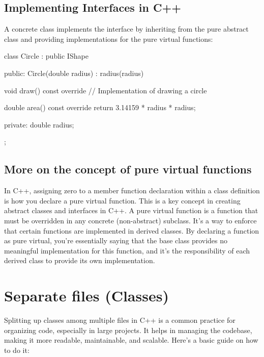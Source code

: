 \documentclass{report}
\begin{document}
    \bigbreak \noindent 
    \subsection{Implementing Interfaces in C++}
    \bigbreak \noindent 
    A concrete class implements the interface by inheriting from the pure abstract class and providing implementations for the pure virtual functions:
    \bigbreak \noindent 
    \begin{cppcode}
class Circle : public IShape {
public:
    Circle(double radius) : radius(radius) {}

    void draw() const override {
        // Implementation of drawing a circle
    }

    double area() const override {
        return 3.14159 * radius * radius;
    }

private:
    double radius;
};
    \end{cppcode}
    \bigbreak \noindent 

    \pagebreak \bigbreak \noindent 
    \subsection{More on the concept of pure virtual functions}
    \bigbreak \noindent 
    \begin{concept}
       In C++, assigning zero to a member function declaration within a class definition is how you declare a pure virtual function. This is a key concept in creating abstract classes and interfaces in C++. 
       \bigbreak \noindent 
       A pure virtual function is a function that must be overridden in any concrete (non-abstract) subclass. It's a way to enforce that certain functions are implemented in derived classes. By declaring a function as pure virtual, you're essentially saying that the base class provides no meaningful implementation for this function, and it's the responsibility of each derived class to provide its own implementation.
    \end{concept}
    
    
    


    
    
    
    

    \pagebreak \bigbreak \noindent 
    \section{Separate files (Classes)}
    \bigbreak \noindent 
    \begin{concept}
       Splitting up classes among multiple files in C++ is a common practice for organizing code, especially in large projects. It helps in managing the codebase, making it more readable, maintainable, and scalable. Here's a basic guide on how to do it:
    \end{concept}
    \bigbreak \noindent 
\end{document}
